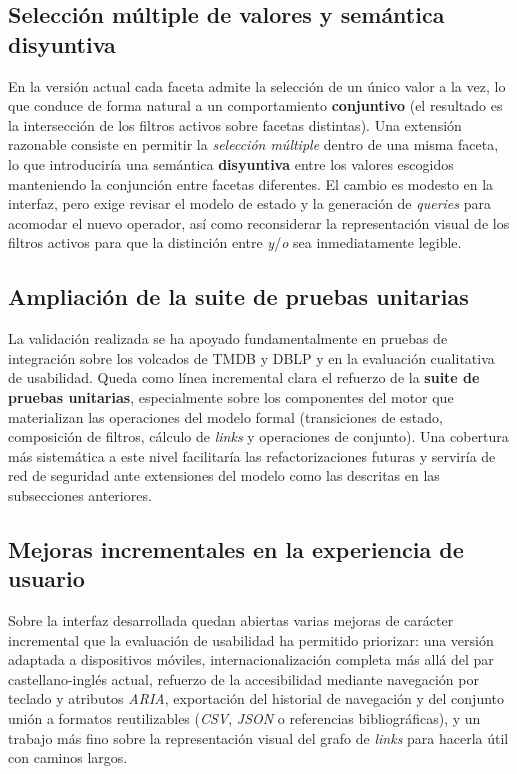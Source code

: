 \subsection{Selección múltiple de valores y semántica disyuntiva}

En la versión actual cada faceta admite la selección de un único valor a la vez, lo que conduce
de forma natural a un comportamiento \textbf{conjuntivo} (el resultado es la intersección de los
filtros activos sobre facetas distintas). Una extensión razonable consiste en permitir la
\textit{selección múltiple} dentro de una misma faceta, lo que introduciría una semántica
\textbf{disyuntiva} entre los valores escogidos manteniendo la conjunción entre facetas
diferentes. El cambio es modesto en la interfaz, pero exige revisar el modelo de estado y la
generación de \textit{queries} para acomodar el nuevo operador, así como reconsiderar la
representación visual de los filtros activos para que la distinción entre \textit{y}/\textit{o}
sea inmediatamente legible.

\subsection{Ampliación de la suite de pruebas unitarias}

La validación realizada se ha apoyado fundamentalmente en pruebas de integración sobre los
volcados de TMDB y DBLP y en la evaluación cualitativa de usabilidad. Queda como línea
incremental clara el refuerzo de la \textbf{suite de pruebas unitarias}, especialmente sobre los
componentes del motor que materializan las operaciones del modelo formal (transiciones de estado,
composición de filtros, cálculo de \textit{links} y operaciones de conjunto). Una cobertura más
sistemática a este nivel facilitaría las refactorizaciones futuras y serviría de red de seguridad
ante extensiones del modelo como las descritas en las subsecciones anteriores.

\subsection{Mejoras incrementales en la experiencia de usuario}

Sobre la interfaz desarrollada quedan abiertas varias mejoras de carácter incremental que la
evaluación de usabilidad ha permitido priorizar: una versión adaptada a dispositivos móviles,
internacionalización completa más allá del par castellano-inglés actual, refuerzo de la
accesibilidad mediante navegación por teclado y atributos \textit{ARIA}, exportación del
historial de navegación y del conjunto unión a formatos reutilizables (\textit{CSV},
\textit{JSON} o referencias bibliográficas), y un trabajo más fino sobre la representación
visual del grafo de \textit{links} para hacerla útil con caminos largos.

